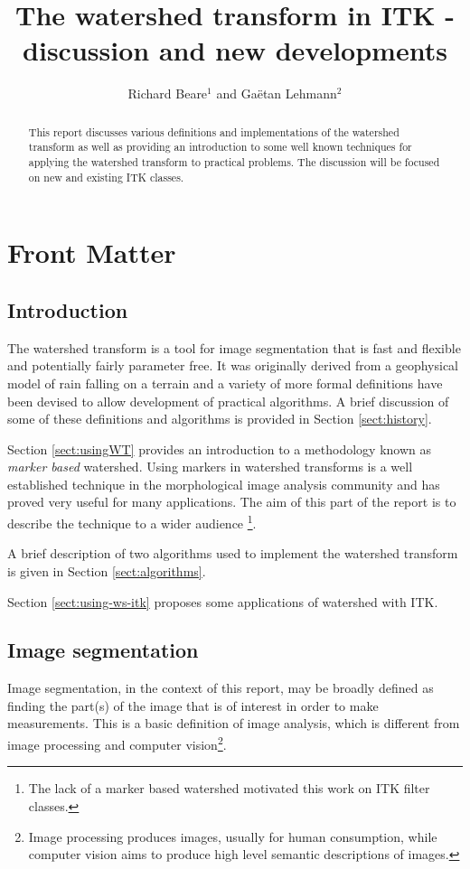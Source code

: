 \documentclass{InsightArticle}
\title{The watershed transform in ITK - discussion and new developments}
\author{Richard Beare{$^1$} {\small{and}} Ga\"etan Lehmann{$^2$}}
\begin{document}
\maketitle

\ifhtml
\chapter*{Front Matter\label{front}}
\fi


\begin{abstract}
\noindent
This report discusses various definitions and implementations of the
watershed transform as well as providing an introduction to some well
known techniques for applying the watershed transform to practical
problems. The discussion will be focused on new and existing ITK
classes.
\end{abstract}

\tableofcontents
\section{Introduction}

The watershed transform is a tool for image segmentation that is fast
and flexible and potentially fairly parameter free. It was originally
derived from a geophysical model of rain falling on a terrain and a variety
of more formal definitions have been devised to allow development of
practical algorithms. A brief discussion of some of these definitions
and algorithms is provided in Section \ref{sect:history}. 

Section \ref{sect:usingWT} provides an introduction to a methodology
known as {\em marker based} watershed. Using markers in watershed
transforms is a well established technique in the morphological image
analysis community and has proved very useful for many
applications. The aim of this part of the report is to describe the
technique to a wider audience \footnote{The lack of a marker based
watershed motivated this work on ITK filter classes.}.

A brief description of two algorithms used to implement the watershed
transform is given in Section \ref{sect:algorithms}.

Section \ref{sect:using-ws-itk} proposes some applications of watershed
with ITK.

\section{Image segmentation}
Image segmentation, in the context of this report, may be broadly
defined as finding the part(s) of the image that is of interest in
order to make measurements. This is a basic definition of image
analysis, which is different from image processing and computer
vision\footnote{Image processing produces images, usually for human
consumption, while computer vision aims to produce high level semantic
descriptions of images.}.
\end{document}
